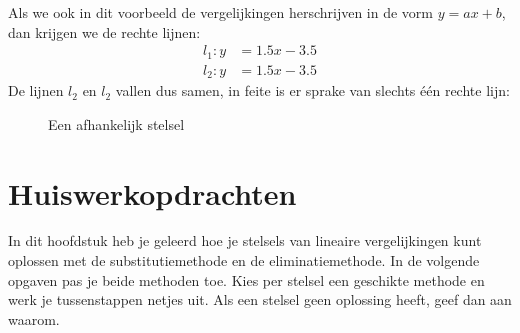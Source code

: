 \begin{enumerate}
    Als we ook in dit voorbeeld de vergelijkingen herschrijven in de vorm $y=ax+b$, dan krijgen we de rechte lijnen:
    \begin{align*}
      l_1:y&=1.5x-3.5\\
      l_2:y&=1.5x-3.5  
    \end{align*}
    De lijnen $l_2$ en $l_2$ vallen dus samen, in feite is er sprake van slechts \'e\'en rechte lijn:
    \begin{figure}[H]
        \centering
        \caption{Een afhankelijk stelsel}
        \label{fig:afhankelijk}
    \end{figure}
\end{enumerate}

\newpage
\section{Huiswerkopdrachten}
In dit hoofdstuk heb je geleerd hoe je stelsels van lineaire vergelijkingen kunt oplossen met de substitutiemethode en de eliminatiemethode. In de volgende opgaven pas je beide methoden toe. Kies per stelsel een geschikte methode en werk je tussenstappen netjes uit. Als een stelsel geen oplossing heeft, geef dan aan waarom.


